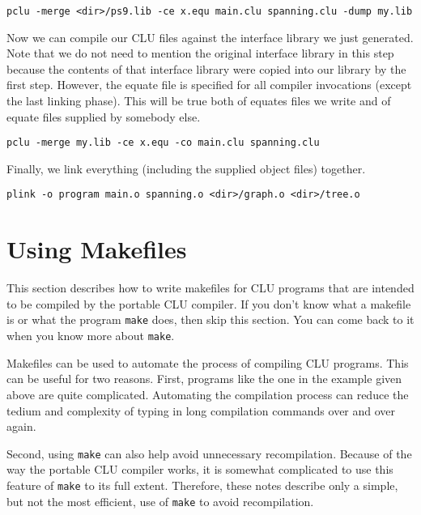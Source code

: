 \begin{indenttext}
\begin{verbatim}
pclu -merge <dir>/ps9.lib -ce x.equ main.clu spanning.clu -dump my.lib
\end{verbatim}
\end{indenttext}

\noindent Now we can compile our CLU files against the interface
library we just generated. Note that we do not need to mention the
original interface library in this step because the contents of that
interface library were copied into our library by the first
step. However, the equate file is specified for all compiler
invocations (except the last linking phase). This will be true both of
equates files we write and of equate files supplied by somebody else.

\begin{indenttext}
  \verb|pclu -merge my.lib -ce x.equ -co main.clu spanning.clu|
\end{indenttext}

\noindent Finally, we link everything (including the supplied object
files) together.

\begin{indenttext}
  \verb|plink -o program main.o spanning.o <dir>/graph.o <dir>/tree.o|
\end{indenttext}

\section{Using Makefiles}

This section describes how to write makefiles for CLU programs that
are intended to be compiled by the portable CLU compiler. If you don't
know what a makefile is or what the program \verb|make| does, then
skip this section. You can come back to it when you know more about
\verb|make|.

Makefiles can be used to automate the process of compiling CLU
programs. This can be useful for two reasons. First, programs like the
one in the example given above are quite complicated. Automating the
compilation process can reduce the tedium and complexity of typing in
long compilation commands over and over again.

Second, using \verb|make| can also help avoid unnecessary
recompilation.  Because of the way the portable CLU compiler works, it
is somewhat complicated to use this feature of \verb|make| to its full
extent.  Therefore, these notes describe only a simple, but not the
most efficient, use of \verb|make| to avoid recompilation.

